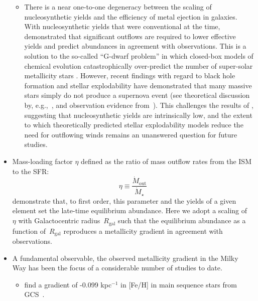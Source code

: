 \documentclass[fleqn, usenatbib]{mnras}
\begin{document}
\begin{itemize}
\begin{itemize}
		\item There is a near one-to-one degeneracy between the scaling of 
		nucleosynthetic yields and the efficiency of metal ejection in 
		galaxies. With nucleosynthetic yields that were conventional at the 
		time,~\citet{Dalcanton2007} demonstrated that significant outflows 
		are required to lower effective yields and predict abundances in 
		agreement with observations. This is a solution to the so-called 
		``G-dwarf problem'' in which closed-box models of chemical evolution 
		\citep[see the review in, e.g.,][]{Tinsley1980}  catastrophically 
		over-predict the number of super-solar metallicity stars 
		\citep{vandenBergh1962, Pagel1975}. However, recent findings with 
		regard to black hole formation and stellar explodability have 
		demonstrated that many massive stars simply do not produce a supernova 
		event (see theoretical discussion by, e.g.,~\citealp{Pejcha2015, 
		Sukhbold2016}, and observation evidence from~\citealp{Gerke2015, 
		Adams2017, Basinger2020}). This challenges the results of 
		\citet{Dalcanton2007}, suggesting that nucleosynthetic yields are 
		intrinsically low, and the extent to which theoretically predicted 
		stellar explodability models reduce the need for outflowing winds 
		remains an unanswered question for future studies. 
	\end{itemize} 

	\item Mass-loading factor $\eta$ defined as the ratio of mass outflow 
	rates from the ISM to the SFR: 
	\begin{equation} 
	\eta \equiv \frac{\dot{M}_\text{out}}{\dot{M}_\star} 
	\end{equation} 
	\citet{Weinberg2017} demonstrate that, to first order, this parameter and 
	the yields of a given element set the late-time equilibrium abundance. 
	Here we adopt a scaling of~$\eta$ with Galactocentric radius~$R_\text{gal}$ 
	such that the equilibrium abundance as a function of~$R_\text{gal}$ 
	reproduces a metallicity gradient in agreement with observations. 

	\item A fundamental observable, the observed metallicity gradient in the 
	Milky Way has been the focus of a considerable number of studies to date. 
	\begin{itemize} 
		\item \citet{Nordstroem2004a} find a gradient of -0.099 kpc$^{-1}$ in 
		[Fe/H] in main sequence stars from GCS~\citep{Nordstroem2004b, 
		Holmberg2007}. 


\end{itemize}
\end{itemize}
\end{document}
